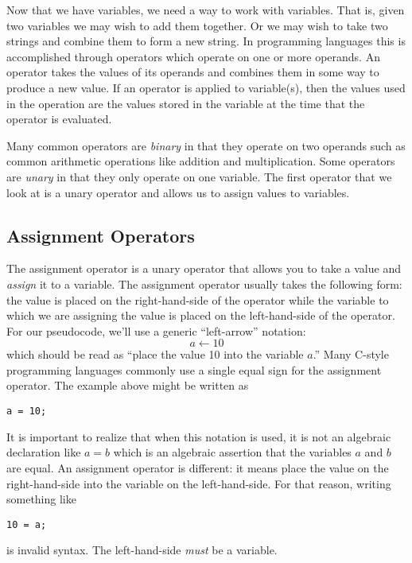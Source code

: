 Now that we have variables, we need a way to work with variables.  That is, 
given two variables we may wish to add them together.  Or we may wish
to take two strings and combine them to form a new string.  In programming
languages this is accomplished through \glspl{operator} which operate on
one or more \glspl{operand}.  An operator takes the values of its operands 
and combines them in some way to produce a new value.
If an operator is applied to variable(s), then the values used in the operation
are the values stored in the variable at the time that the operator is evaluated.

Many common operators are \emph{binary} in that they operate on two operands
such as common arithmetic operations like addition and multiplication.  Some
operators are \emph{unary} in that they only operate on one variable.  The
first operator that we look at is a unary operator and allows us to assign values 
to variables.

\subsection{Assignment Operators}

The \gls{assignment operator} is a unary operator that allows you to take a
value and \emph{assign} it to a variable.  The assignment operator usually takes
the following form: the value is placed on the right-hand-side of the operator
while the variable to which we are assigning the value is placed on the left-hand-side
of the operator.  For our pseudocode, we'll use a generic ``left-arrow'' notation:
  $$a \leftarrow 10$$
which should be read as ``place the value 10 into the variable $a$.''  
Many C-style programming languages commonly use a single equal sign 
for the assignment 
operator.  The example above might be written as

\texttt{a = 10;}

It is important to realize that when this notation is used, it is not an algebraic declaration like $a = b$ which is an algebraic assertion that the variables 
$a$ and $b$ are equal.  An assignment operator is different: it means place the value
on the right-hand-side into the variable on the left-hand-side.  For that reason, writing
something like 

\texttt{10 = a;}

is invalid syntax.  The left-hand-side \emph{must} be a variable.

